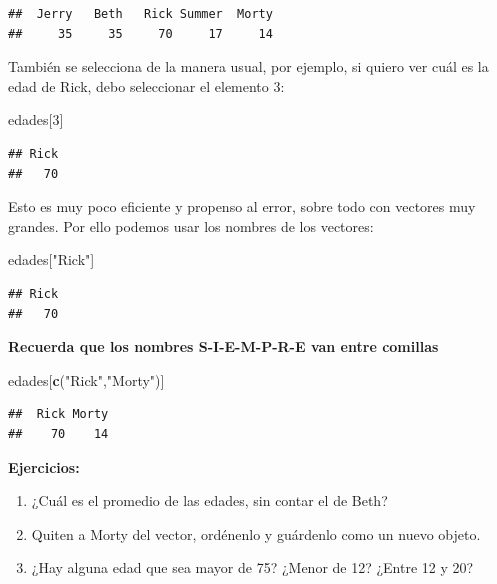 \documentclass[
]{book}
\newenvironment{Shaded}{\begin{snugshade}}{\end{snugshade}}
\newcommand{\DecValTok}[1]{\textcolor[rgb]{0.00,0.00,0.81}{#1}}
\newcommand{\FunctionTok}[1]{\textcolor[rgb]{0.13,0.29,0.53}{\textbf{#1}}}
\newcommand{\NormalTok}[1]{#1}
\newcommand{\StringTok}[1]{\textcolor[rgb]{0.31,0.60,0.02}{#1}}
\providecommand{\tightlist}{%
  \setlength{\itemsep}{0pt}\setlength{\parskip}{0pt}}
\begin{document}
\begin{verbatim}
##  Jerry   Beth   Rick Summer  Morty 
##     35     35     70     17     14
\end{verbatim}

También se selecciona de la manera usual, por ejemplo, si quiero ver cuál es la edad de Rick, debo seleccionar el elemento 3:

\begin{Shaded}
\begin{Highlighting}[]
\NormalTok{edades[}\DecValTok{3}\NormalTok{]}
\end{Highlighting}
\end{Shaded}

\begin{verbatim}
## Rick 
##   70
\end{verbatim}

Esto es muy poco eficiente y propenso al error, sobre todo con vectores muy grandes. Por ello podemos usar los nombres de los vectores:

\begin{Shaded}
\begin{Highlighting}[]
\NormalTok{edades[}\StringTok{"Rick"}\NormalTok{]}
\end{Highlighting}
\end{Shaded}

\begin{verbatim}
## Rick 
##   70
\end{verbatim}

\textbf{Recuerda que los nombres S-I-E-M-P-R-E van entre comillas}

\begin{Shaded}
\begin{Highlighting}[]
\NormalTok{edades[}\FunctionTok{c}\NormalTok{(}\StringTok{"Rick"}\NormalTok{,}\StringTok{"Morty"}\NormalTok{)]}
\end{Highlighting}
\end{Shaded}

\begin{verbatim}
##  Rick Morty 
##    70    14
\end{verbatim}

\textbf{Ejercicios:}

\begin{enumerate}
\def\labelenumi{\arabic{enumi}.}
\tightlist
\item
  ¿Cuál es el promedio de las edades, sin contar el de Beth?
\item
  Quiten a Morty del vector, ordénenlo y guárdenlo como un nuevo objeto.
\item
  ¿Hay alguna edad que sea mayor de 75? ¿Menor de 12? ¿Entre 12 y 20?
\end{enumerate}
\end{document}
